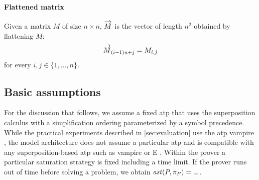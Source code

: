 \paragraph{Flattened matrix}
Given a matrix \(M\) of size \(n \times n\),
\(\overrightarrow{M}\) is the vector of length \(n^2\) obtained by flattening \(M\):
\begin{align*}
\overrightarrow{M}_{(i - 1) n + j} = M_{i, j}
\end{align*}
for every \(i,j\in\{1,\ldots,n\}\).


\subsection{Basic assumptions}

For the discussion that follows,
we assume a fixed %
\gls{atp} that uses the superposition calculus with a simplification ordering parameterized by a symbol precedence.
While the practical experiments described in \autoref{sec:evaluation} use the \gls{atp} \gls{vampire} \cite{Kovacs2013},
the model architecture does not assume a particular \gls{atp}
and is compatible with any superposition-based \gls{atp} such as \gls{vampire} or E \cite{SCV:CADE-2019}.
% 
Within the prover a particular saturation strategy is fixed including a time limit.
If the prover runs out of time before solving a problem, we obtain \(\operatorname{\mathit{ast}}(P,\pi_P) = \bot\).




